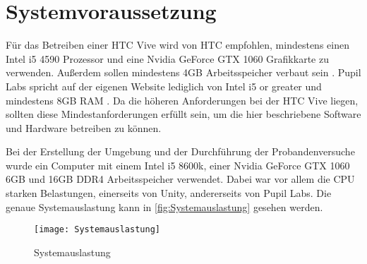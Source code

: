 \section{Systemvoraussetzung}
Für das Betreiben einer HTC Vive wird von HTC empfohlen, mindestens einen Intel i5 4590 Prozessor und eine Nvidia GeForce GTX 1060 Grafikkarte zu verwenden. Außerdem sollen mindestens 4GB Arbeitsspeicher verbaut sein \cite{sys.requirements.2020}.  Pupil Labs spricht auf der eigenen Website lediglich von \glqq Intel i5 or greater\grqq{} und mindestens 8GB RAM \cite{Pupil.Labs.reqs}. Da die höheren Anforderungen bei der HTC Vive liegen, sollten diese Mindestanforderungen erfüllt sein, um die hier beschriebene Software und Hardware betreiben zu können. 

Bei der Erstellung der Umgebung und der Durchführung der Probandenversuche wurde ein Computer mit einem Intel i5 8600k, einer Nvidia GeForce GTX 1060 6GB und 16GB DDR4 Arbeitsspeicher verwendet. Dabei war vor allem die CPU starken Belastungen, einerseits von Unity, andererseits von Pupil Labs. Die genaue Systemauslastung kann in \autoref{fig:Systemauslastung} gesehen werden.

\begin{figure}[!htbp]
	\centering
	\texttt{[image: Systemauslastung]}
	\caption[Systemauslastung]{Systemauslastung}
	\label{fig:Systemauslastung}
\end{figure}